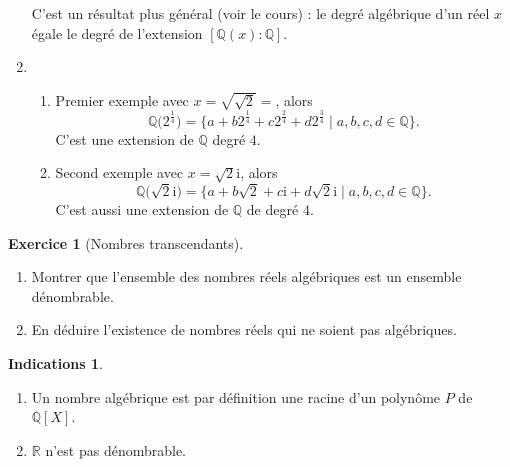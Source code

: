 \documentclass[11pt,a4paper]{article}
\newcommand{\Qq}{\mathbb{Q}} \newcommand{\Q}{\mathbb{Q}}
\newcommand{\Rr}{\mathbb{R}} \newcommand{\R}{\mathbb{R}}
\theoremstyle{definition}
\newtheorem{exo}{Exercice}
\newtheorem{ind}{Indications}
\newcommand{\exercice}[1]{} \newcommand{\finexercice}{}
\newcommand{\enonce}{\begin{exo}} \newcommand{\finenonce}{\end{exo}}
\newcommand{\indication}{\begin{ind}} \newcommand{\finindication}{\end{ind}}
\newcommand{\ii}{\mathrm{i}}
\begin{document}
\begin{enumerate}
\begin{enumerate}
  \end{enumerate}  
  C'est un résultat plus général (voir le cours) : le degré algébrique d'un réel $x$
  égale le degré de l'extension $[\Qq(x):\Qq]$.
  
  \item 
  \begin{enumerate}
    \item 
  Premier exemple avec $x = \sqrt{\sqrt{2}} = $, alors
  $$\Qq\big(2^{\frac14}\big) = \big\{ a + b 2^{\frac14} + c 2^{\frac24} + d  2^{\frac34} \mid a,b,c,d \in \Qq \big\}.$$
  C'est une extension de $\Qq$ degré $4$.
    \item
  Second exemple avec $x = \sqrt{2}\ii$, alors
  $$\Qq\big(\sqrt{2}\ii\big) = \big\{ a + b \sqrt{2} + c \ii  + d \sqrt{2}\ii  \mid a,b,c,d \in \Qq   \big\}.$$
  C'est aussi une extension de $\Qq$ de degré $4$.
  \end{enumerate}
\end{enumerate}


\fincorrection
\finexercice


\exercice{}
\enonce[Nombres transcendants]
\ 
\begin{enumerate}
 \item Montrer que l'ensemble des nombres réels algébriques est un ensemble dénombrable.
 \item En déduire l'existence de nombres réels qui ne soient pas algébriques.
\end{enumerate}
\finenonce

\indication
\begin{enumerate}
  \item Un nombre algébrique est par définition
  une racine d'un polynôme $P$ de $\Qq[X]$. 
  
  \item $\Rr$ n'est pas dénombrable.
\end{enumerate}


\finindication
\end{document}
